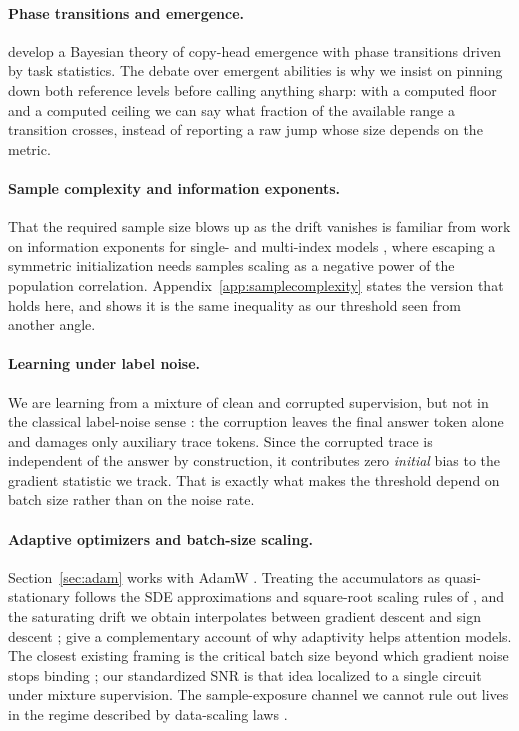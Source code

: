 \documentclass{article}
\theoremstyle{plain}
\theoremstyle{definition}
\theoremstyle{remark}
\newcommand{\1}{\mathbf{1}}
\begin{document}
\paragraph{Phase transitions and emergence.}
\citet{lavie2026phase} develop a Bayesian theory of copy-head emergence with
phase transitions driven by task statistics. The debate over emergent abilities
\citep{wei2022emergent,schaeffer2023mirage} is why we insist on pinning down both
reference levels before calling anything sharp: with a computed floor and a
computed ceiling we can say what fraction of the available range a transition
crosses, instead of reporting a raw jump whose size depends on the metric.

\paragraph{Sample complexity and information exponents.}
That the required sample size blows up as the drift vanishes is familiar from
work on information exponents for single- and multi-index models
\citep{benarous2021online,damian2023smoothing,abbe2023sgd}, where escaping a
symmetric initialization needs samples scaling as a negative power of the
population correlation. Appendix~\ref{app:samplecomplexity} states the version
that holds here, and shows it is the same inequality as our threshold seen from
another angle.

\paragraph{Learning under label noise.}
We are learning from a mixture of clean and corrupted supervision, but not in the
classical label-noise sense \citep{natarajan2013learning}: the corruption leaves
the final answer token alone and damages only auxiliary trace tokens. Since the
corrupted trace is independent of the answer by construction, it contributes zero
\emph{initial} bias to the gradient statistic we track. That is exactly what makes
the threshold depend on batch size rather than on the noise rate.

\paragraph{Adaptive optimizers and batch-size scaling.}
Section~\ref{sec:adam} works with AdamW
\citep{kingma2015adam,loshchilov2019decoupled}. Treating the accumulators as
quasi-stationary follows the SDE approximations and square-root scaling rules of
\citet{malladi2022sdes}, and the saturating drift we obtain interpolates between
gradient descent and sign descent \citep{bernstein2018signsgd};
\citet{zhang2020adaptive} give a complementary account of why adaptivity helps
attention models. The closest existing framing is the critical batch size beyond
which gradient noise stops binding \citep{mccandlish2018empirical}; our
standardized SNR is that idea localized to a single circuit under mixture
supervision. The sample-exposure channel we cannot rule out lives in the regime
described by data-scaling laws \citep{kaplan2020scaling}.
\end{document}
